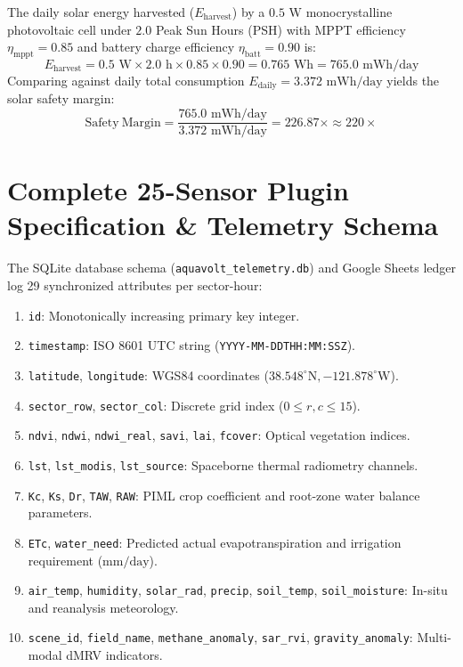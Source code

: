 \documentclass[sn-mathphys-num,Numbered]{sn-jnl}
\begin{document}
\begin{appendices}
The daily solar energy harvested ($E_{\text{harvest}}$) by a $0.5\text{ W}$ monocrystalline photovoltaic cell under $2.0$ Peak Sun Hours (PSH) with MPPT efficiency $\eta_{\text{mppt}} = 0.85$ and battery charge efficiency $\eta_{\text{batt}} = 0.90$ is:
$$E_{\text{harvest}} = 0.5\text{ W} \times 2.0\text{ h} \times 0.85 \times 0.90 = 0.765\text{ Wh} = 765.0\text{ mWh/day}$$
Comparing against daily total consumption $E_{\text{daily}} = 3.372\text{ mWh/day}$ yields the solar safety margin:
$$\mathrm{Safety\ Margin} = \frac{765.0\text{ mWh/day}}{3.372\text{ mWh/day}} = 226.87\times \approx 220\times$$

\section{Complete 25-Sensor Plugin Specification \& Telemetry Schema}\label{app:sensor_catalog}
The SQLite database schema (\texttt{aquavolt\_telemetry.db}) and Google Sheets ledger log 29 synchronized attributes per sector-hour:
\begin{enumerate}
    \item \texttt{id}: Monotonically increasing primary key integer.
    \item \texttt{timestamp}: ISO 8601 UTC string (\texttt{YYYY-MM-DDTHH:MM:SSZ}).
    \item \texttt{latitude}, \texttt{longitude}: WGS84 coordinates ($38.548^\circ\text{N}, -121.878^\circ\text{W}$).
    \item \texttt{sector\_row}, \texttt{sector\_col}: Discrete grid index ($0 \le r, c \le 15$).
    \item \texttt{ndvi}, \texttt{ndwi}, \texttt{ndwi\_real}, \texttt{savi}, \texttt{lai}, \texttt{fcover}: Optical vegetation indices.
    \item \texttt{lst}, \texttt{lst\_modis}, \texttt{lst\_source}: Spaceborne thermal radiometry channels.
    \item \texttt{Kc}, \texttt{Ks}, \texttt{Dr}, \texttt{TAW}, \texttt{RAW}: PIML crop coefficient and root-zone water balance parameters.
    \item \texttt{ETc}, \texttt{water\_need}: Predicted actual evapotranspiration and irrigation requirement ($\text{mm/day}$).
    \item \texttt{air\_temp}, \texttt{humidity}, \texttt{solar\_rad}, \texttt{precip}, \texttt{soil\_temp}, \texttt{soil\_moisture}: In-situ and reanalysis meteorology.
    \item \texttt{scene\_id}, \texttt{field\_name}, \texttt{methane\_anomaly}, \texttt{sar\_rvi}, \texttt{gravity\_anomaly}: Multi-modal dMRV indicators.
\end{enumerate}


\end{appendices}
\end{document}
